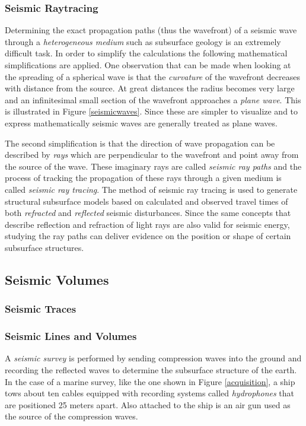 \documentclass[twocolumn]{article}
\begin{document}
\subsubsection*{Seismic Raytracing}
Determining the exact propagation paths (thus the wavefront) of a seismic wave through a \textit{heterogeneous medium} such as subsurface geology is an extremely difficult task. In order to simplify the calculations the following mathematical simplifications are applied. 
One observation that can be made when looking at the spreading of a spherical wave is that the \textit{curvature} of the wavefront decreases with distance from the source. At great distances the radius becomes very large and an infinitesimal small section of the wavefront approaches a \textit{plane wave}. This is illustrated in Figure \ref{seismicwaves}. Since these are simpler to visualize and to express mathematically seismic waves are generally treated as plane waves.

The second simplification is that the direction of wave propagation can be described by \textit{rays} which are perpendicular to the wavefront and point away from the source of the wave. These imaginary rays are called \textit{seismic ray paths} and the process of tracking the propagation of these rays through a given medium is called \textit{seismic ray tracing}. The method of seismic ray tracing is used to generate structural subsurface models based on calculated and observed travel times of both \textit{refracted} and \textit{reflected} seismic disturbances. Since the same concepts that describe reflection and refraction of light rays are also valid for seismic energy, studying the ray paths can deliver evidence on the position or shape of certain subsurface structures.

\subsection{Seismic Volumes}
\subsubsection*{Seismic Traces}
\subsubsection*{Seismic Lines and Volumes}



A \emph{seismic survey} is performed by sending compression waves into the ground and recording the reflected waves to determine the subsurface structure of the earth. In the case of a marine survey, like the one shown in Figure \ref{acquisition}, a ship tows about ten cables equipped with recording systems called \emph{hydrophones} that are positioned 25 meters apart. Also attached to the ship is an air gun used as the source of the compression waves.
\end{document}
